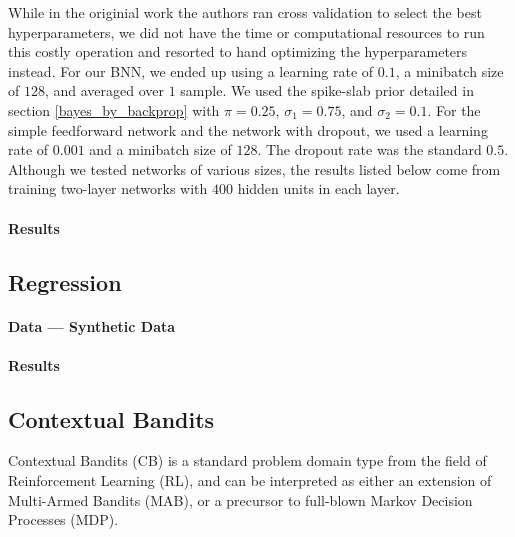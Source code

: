 \documentclass[11pt]{article}
\begin{document}
While in the originial work the authors ran cross validation to select the best
hyperparameters, we did not have the time or computational resources to run this
costly operation and resorted to hand optimizing the hyperparameters instead.
For our BNN, we ended up using a learning rate of $0.1$, a minibatch size of 
$128$, and averaged over $1$ sample. We used the spike-slab prior detailed in
section \ref{bayes_by_backprop} with $\pi = 0.25$, $\sigma_1 = 0.75$, and 
$\sigma_2 = 0.1$. For the simple feedforward network and the network with 
dropout, we used a learning rate of $0.001$ and a minibatch size of $128$.
The dropout rate was the standard $0.5$. Although we tested networks of various
sizes, the results listed below come from training two-layer networks with
$400$ hidden units in each layer.

\paragraph{Results}

\subsection{Regression}
\paragraph{Data --- Synthetic Data}
\paragraph{Results}

\subsection{Contextual Bandits}

Contextual Bandits (CB) is a standard problem domain type from the field of
Reinforcement Learning (RL), and can be interpreted as either an extension of
Multi-Armed Bandits (MAB), or a precursor to full-blown Markov Decision
Processes (MDP).



\end{document}
